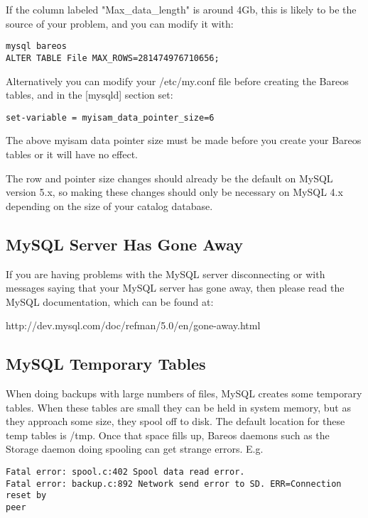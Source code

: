 If the column labeled "Max\_data\_length" is around 4Gb, this is likely
to be the source of your problem, and you can modify it with:

\footnotesize
\begin{verbatim}
mysql bareos
ALTER TABLE File MAX_ROWS=281474976710656;
\end{verbatim}
\normalsize

Alternatively you can modify your /etc/my.conf file before creating the
Bareos tables, and in the [mysqld] section set:

\footnotesize
\begin{verbatim}
set-variable = myisam_data_pointer_size=6
\end{verbatim}
\normalsize

The above myisam data pointer size must be made before you create your
Bareos tables or it will have no effect.

The row and pointer size changes should already be the default on MySQL
version 5.x, so making these changes should only be necessary on MySQL 4.x
depending on the size of your catalog database.

\subsection{MySQL Server Has Gone Away}
If you are having problems with the MySQL server disconnecting or with
messages saying that your MySQL server has gone away, then please read
the MySQL documentation, which can be found at:

{http://dev.mysql.com/doc/refman/5.0/en/gone-away.html}

\subsection{MySQL Temporary Tables}
When doing backups with large numbers of files, MySQL creates some
temporary tables.  When these tables are small they can be held in
system memory, but as they approach some size, they
spool off to disk.  The default location for these temp tables is
/tmp.  Once that space fills up, Bareos daemons such as the Storage
daemon doing spooling can get strange errors. E.g.

\footnotesize
\begin{verbatim}
Fatal error: spool.c:402 Spool data read error.
Fatal error: backup.c:892 Network send error to SD. ERR=Connection reset by
peer
\end{verbatim}
\normalsize

